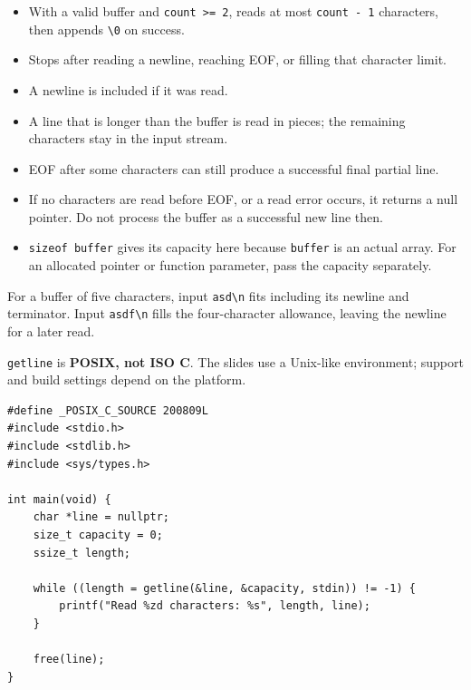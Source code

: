 \documentclass[11pt,a4paper]{article}
\providecommand{\tightlist}{\setlength{\itemsep}{0pt}\setlength{\parskip}{0pt}}
\begin{document}
\begin{itemize}
\tightlist
\item
  With a valid buffer and \texttt{count\ \textgreater{}=\ 2}, reads at most \texttt{count\ -\ 1} characters, then appends \texttt{\textquotesingle{}\textbackslash{}0\textquotesingle{}} on success.
\item
  Stops after reading a newline, reaching EOF, or filling that character limit.
\item
  A newline is included if it was read.
\item
  A line that is longer than the buffer is read in pieces; the remaining characters stay in the input stream.
\item
  EOF after some characters can still produce a successful final partial line.
\item
  If no characters are read before EOF, or a read error occurs, it returns a null pointer. Do not process the buffer as a successful new line then.
\item
  \texttt{sizeof\ buffer} gives its capacity here because \texttt{buffer} is an actual array. For an allocated pointer or function parameter, pass the capacity separately.
\end{itemize}

For a buffer of five characters, input \texttt{asd\textbackslash{}n} fits including its newline and terminator. Input \texttt{asdf\textbackslash{}n} fills the four-character allowance, leaving the newline for a later read.

\label{getline-reading-a-dynamically-sized-line}
\hypertarget{getline-reading-a-dynamically-sized-line}{}

\texttt{getline} is \textbf{POSIX, not ISO C}. The slides use a Unix-like environment; support and build settings depend on the platform.

\begin{lstlisting}[style=cscode]
#define _POSIX_C_SOURCE 200809L
#include <stdio.h>
#include <stdlib.h>
#include <sys/types.h>

int main(void) {
    char *line = nullptr;
    size_t capacity = 0;
    ssize_t length;

    while ((length = getline(&line, &capacity, stdin)) != -1) {
        printf("Read %zd characters: %s", length, line);
    }

    free(line);
}
\end{lstlisting}
\end{document}
